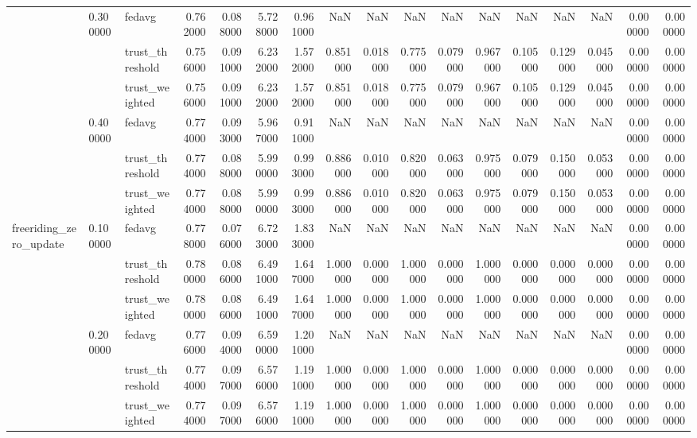 \begin{tabular}{lllrrrrrrrrrrrrrr}
\cline{2-17}
 & \multirow[t]{3}{*}{0.300000} & fedavg & 0.762000 & 0.088000 & 5.728000 & 0.961000 & NaN & NaN & NaN & NaN & NaN & NaN & NaN & NaN & 0.000000 & 0.000000 \\
 &  & trust_threshold & 0.756000 & 0.091000 & 6.232000 & 1.572000 & 0.851000 & 0.018000 & 0.775000 & 0.079000 & 0.967000 & 0.105000 & 0.129000 & 0.045000 & 0.000000 & 0.000000 \\
 &  & trust_weighted & 0.756000 & 0.091000 & 6.232000 & 1.572000 & 0.851000 & 0.018000 & 0.775000 & 0.079000 & 0.967000 & 0.105000 & 0.129000 & 0.045000 & 0.000000 & 0.000000 \\
\cline{2-17}
 & \multirow[t]{3}{*}{0.400000} & fedavg & 0.774000 & 0.093000 & 5.967000 & 0.911000 & NaN & NaN & NaN & NaN & NaN & NaN & NaN & NaN & 0.000000 & 0.000000 \\
 &  & trust_threshold & 0.774000 & 0.088000 & 5.990000 & 0.993000 & 0.886000 & 0.010000 & 0.820000 & 0.063000 & 0.975000 & 0.079000 & 0.150000 & 0.053000 & 0.000000 & 0.000000 \\
 &  & trust_weighted & 0.774000 & 0.088000 & 5.990000 & 0.993000 & 0.886000 & 0.010000 & 0.820000 & 0.063000 & 0.975000 & 0.079000 & 0.150000 & 0.053000 & 0.000000 & 0.000000 \\
\cline{1-17} \cline{2-17}
\multirow[t]{12}{*}{freeriding_zero_update} & \multirow[t]{3}{*}{0.100000} & fedavg & 0.778000 & 0.076000 & 6.723000 & 1.833000 & NaN & NaN & NaN & NaN & NaN & NaN & NaN & NaN & 0.000000 & 0.000000 \\
 &  & trust_threshold & 0.780000 & 0.086000 & 6.491000 & 1.647000 & 1.000000 & 0.000000 & 1.000000 & 0.000000 & 1.000000 & 0.000000 & 0.000000 & 0.000000 & 0.000000 & 0.000000 \\
 &  & trust_weighted & 0.780000 & 0.086000 & 6.491000 & 1.647000 & 1.000000 & 0.000000 & 1.000000 & 0.000000 & 1.000000 & 0.000000 & 0.000000 & 0.000000 & 0.000000 & 0.000000 \\
\cline{2-17}
 & \multirow[t]{3}{*}{0.200000} & fedavg & 0.776000 & 0.094000 & 6.590000 & 1.201000 & NaN & NaN & NaN & NaN & NaN & NaN & NaN & NaN & 0.000000 & 0.000000 \\
 &  & trust_threshold & 0.774000 & 0.097000 & 6.576000 & 1.191000 & 1.000000 & 0.000000 & 1.000000 & 0.000000 & 1.000000 & 0.000000 & 0.000000 & 0.000000 & 0.000000 & 0.000000 \\
 &  & trust_weighted & 0.774000 & 0.097000 & 6.576000 & 1.191000 & 1.000000 & 0.000000 & 1.000000 & 0.000000 & 1.000000 & 0.000000 & 0.000000 & 0.000000 & 0.000000 & 0.000000 \\

\end{tabular}
